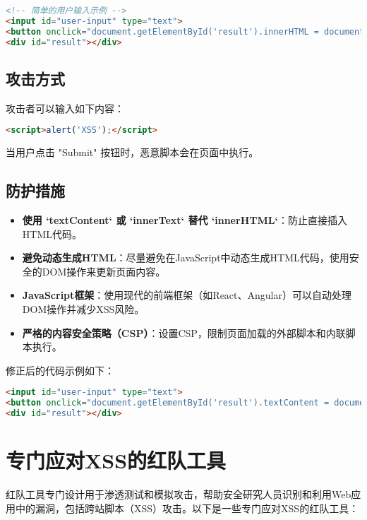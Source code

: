 \documentclass{article}
\begin{document}
\begin{lstlisting}[language=HTML, caption=DOM 型 XSS 的不安全代码示例]
<!-- 简单的用户输入示例 -->
<input id="user-input" type="text">
<button onclick="document.getElementById('result').innerHTML = document.getElementById('user-input').value">Submit</button>
<div id="result"></div>
\end{lstlisting}

\subsection{攻击方式}
攻击者可以输入如下内容：

\begin{lstlisting}[language=HTML, caption=恶意脚本]
<script>alert('XSS');</script>
\end{lstlisting}

当用户点击 "Submit" 按钮时，恶意脚本会在页面中执行。

\subsection{防护措施}
\begin{itemize}
    \item \textbf{使用 `textContent` 或 `innerText` 替代 `innerHTML`}：防止直接插入HTML代码。
    \item \textbf{避免动态生成HTML}：尽量避免在JavaScript中动态生成HTML代码，使用安全的DOM操作来更新页面内容。
    \item \textbf{JavaScript框架}：使用现代的前端框架（如React、Angular）可以自动处理DOM操作并减少XSS风险。
    \item \textbf{严格的内容安全策略（CSP）}：设置CSP，限制页面加载的外部脚本和内联脚本执行。
\end{itemize}

修正后的代码示例如下：

\begin{lstlisting}[language=HTML, caption=DOM 型 XSS 的安全代码示例]
<input id="user-input" type="text">
<button onclick="document.getElementById('result').textContent = document.getElementById('user-input').value">Submit</button>
<div id="result"></div>
\end{lstlisting}

\section{专门应对XSS的红队工具}

红队工具专门设计用于渗透测试和模拟攻击，帮助安全研究人员识别和利用Web应用中的漏洞，包括跨站脚本（XSS）攻击。以下是一些专门应对XSS的红队工具：
\end{document}
